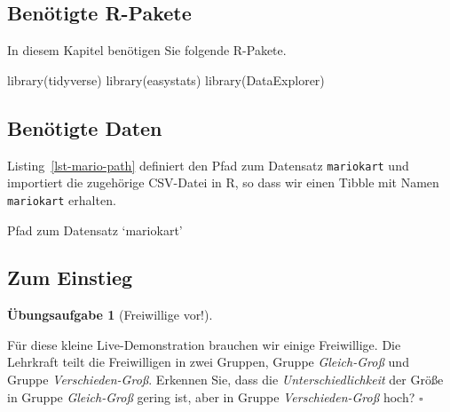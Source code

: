 \documentclass[
  letterpaper,
]{scrbook}
\newenvironment{Shaded}{\begin{snugshade}}{\end{snugshade}}
\newcommand{\FunctionTok}[1]{\textcolor[rgb]{0.28,0.35,0.67}{#1}}
\newcommand{\NormalTok}[1]{\textcolor[rgb]{0.00,0.23,0.31}{#1}}
\newcommand{\OtherTok}[1]{\textcolor[rgb]{0.00,0.23,0.31}{#1}}
\newcommand{\StringTok}[1]{\textcolor[rgb]{0.13,0.47,0.30}{#1}}
\theoremstyle{definition}
\theoremstyle{definition}
\theoremstyle{definition}
\newtheorem{exercise}{Übungsaufgabe}[chapter]
\theoremstyle{remark}
\begin{document}
\subsection{Benötigte R-Pakete}\label{benuxf6tigte-r-pakete-3}

In diesem Kapitel benötigen Sie folgende R-Pakete.

\begin{Shaded}
\begin{Highlighting}[]
\FunctionTok{library}\NormalTok{(tidyverse)}
\FunctionTok{library}\NormalTok{(easystats)}
\FunctionTok{library}\NormalTok{(DataExplorer)}
\end{Highlighting}
\end{Shaded}

\subsection{Benötigte Daten}\label{benuxf6tigte-daten-4}

Listing~\ref{lst-mario-path} definiert den Pfad zum Datensatz
\texttt{mariokart} und importiert die zugehörige CSV-Datei in R, so dass
wir einen Tibble mit Namen \texttt{mariokart} erhalten.

\begin{codelisting}

\caption{\label{lst-mario-path}Pfad zum Datensatz `mariokart'}

\centering{

\begin{Shaded}
\begin{Highlighting}[]
\NormalTok{mariokart\_path }\OtherTok{\textless{}{-}} \FunctionTok{paste0}\NormalTok{(}
  \StringTok{"https://vincentarelbundock.github.io/Rdatasets/"}\NormalTok{,}
  \StringTok{"csv/openintro/mariokart.csv"}\NormalTok{)}

\NormalTok{mariokart }\OtherTok{\textless{}{-}} \FunctionTok{read.csv}\NormalTok{(mariokart\_path)}
\end{Highlighting}
\end{Shaded}

}

\end{codelisting}%

\subsection{Zum Einstieg}\label{zum-einstieg-1}

\begin{exercise}[Freiwillige
vor!]\protect\hypertarget{exr-streuung-erkennen}{}\label{exr-streuung-erkennen}

Für diese kleine Live-Demonstration brauchen wir einige Freiwillige. Die
Lehrkraft teilt die Freiwilligen in zwei Gruppen, Gruppe
\emph{Gleich-Groß} und Gruppe \emph{Verschieden-Groß}. Erkennen Sie,
dass die \emph{Unterschiedlichkeit} der Größe in Gruppe
\emph{Gleich-Groß} gering ist, aber in Gruppe \emph{Verschieden-Groß}
hoch? \(\square\)

\end{exercise}
\end{document}
